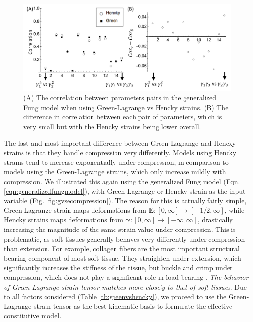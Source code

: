 \begin{figure}
\centering
\includegraphics[width=6.5in]{Figures/gvsecorrelation}
\caption{(A) The correlation between parameters pairs in the generalized Fung model when using Green-Lagrange vs Hencky strains. (B) The difference in correlation between each pair of parameters, which is very small but with the Hencky strains being lower overall.}
\label{fig:gvsecorrelation}
\end{figure}

    
    The last and most important difference between Green-Lagrange and Hencky strains is that they handle compression very differently. Models using Hencky strains tend to increase exponentially under compression, in comparison to models using the Green-Lagrange strains, which only increase mildly with compression. We illustrated this again using the generalized Fung model (Eqn. \ref{eqn:generalizedfungmodel}), with Green-Lagrange or Hencky strain as the input variable (Fig. \ref{fig:gvsecompression}). The reason for this is actually fairly simple, Green-Lagrange strain maps deformations from $\mathbf{E}: [0,\infty] \rightarrow [-1/2,\infty]$, while Hencky strains maps deformations from $\mathbf{\gamma}: [0,\infty] \rightarrow [-\infty,\infty]$, drastically increasing the magnitude of the same strain value under compression. This is problematic, as soft tissues generally behaves very differently under compression than extension. For example, collagen fibers are the most important structural bearing component of most soft tissue. They straighten under extension, which significantly increases the stiffness of the tissue, but buckle and crimp under compression, which does not play a significant role in load bearing \cite{soares_mathematical_2017}. \emph{The behavior of Green-Lagrange strain tensor matches more closely to that of soft tissues}. Due to all factors considered (Table \ref{tb:greenvshencky}), we proceed to use the Green-Lagrange strain tensor as the best kinematic basis to formulate the effective constitutive model. 
    
